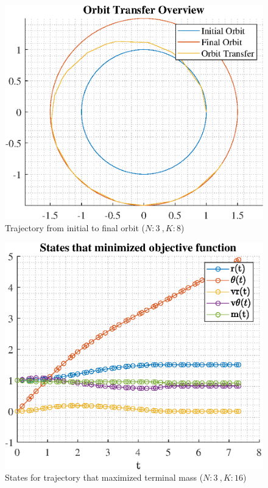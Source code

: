 \documentclass[]{article}
\begin{document}
\begin{figure}
	\centering
	\includegraphics[scale=0.75]{orbit_N3_K8_C2_mf.eps}
	\caption{Trajectory from initial to final orbit (\(N:3\ , K:8\))}
	\label{fig:orbit_N3_K8_C2_mf}
\end{figure}
\begin{figure}
	\centering
	\includegraphics[scale=0.75]{states_N3_K16_C2_mf.eps}
	\caption{States for trajectory that maximized terminal mass (\(N:3\ , K:16\))}
	\label{fig:states_N3_K16_C2_mf}
\end{figure}
\end{document}
